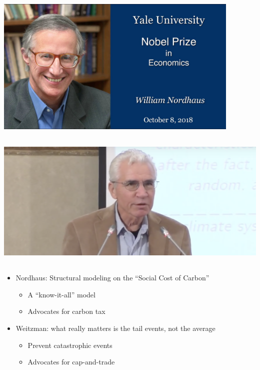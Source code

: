 \begin{frame}{}
\protect\hypertarget{section-21}{}

\includegraphics[width=\textwidth,height=2.60417in]{figures/m4_nordhaus.jpg}

\includegraphics[width=\textwidth,height=2.60417in]{figures/m4_weitzman.png}

\end{frame}

\begin{frame}{}
\protect\hypertarget{section-22}{}

\begin{itemize}
\tightlist
\item
  Nordhaus: Structural modeling on the ``Social Cost of Carbon''

  \begin{itemize}
  \tightlist
  \item
    A ``know-it-all'' model
  \item
    Advocates for carbon tax
  \end{itemize}
\item
  Weitzman: what really matters is the tail events, not the average

  \begin{itemize}
  \tightlist
  \item
    Prevent catastrophic events
  \item
    Advocates for cap-and-trade
  \end{itemize}
\end{itemize}

\end{frame}

